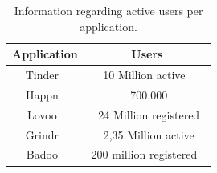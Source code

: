 \begin{table}[ht]
\centering
\caption{Information regarding active users per application.}
\def\arraystretch{2.0}
\begin{tabular}{| c | c |}
  \hline
    Application                 & Users  \\
  \hline
  \hline
    Tinder~\cite{tinder}        & 10 Million active~\cite{tinderusers}     \\
    Happn~\cite{happn}         & ~ 700.000~\cite{happnusers}                 \\
    Lovoo~\cite{lovoo}         & ~ 24 Million registered~\cite{lovoousers}        \\
    Grindr~\cite{grindr}         & ~ 2,35 Million active~\cite{grindrusers}\\
    Badoo~\cite{badoo}         & 200 million registered~\cite{badoousers}    \\
  \hline
\end{tabular}
\label{table:apps}
\end{table}

